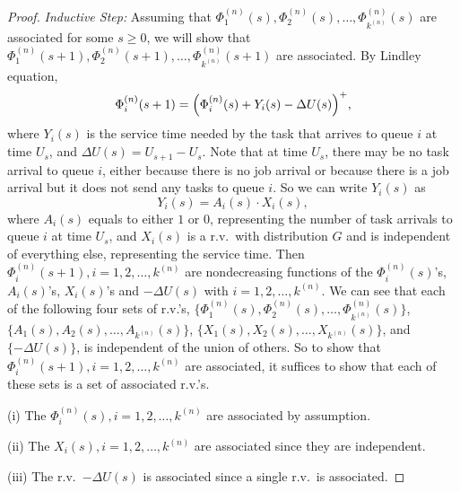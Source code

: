 \documentclass[sigconf]{acmart}
\newcommand{\supn}{^{(n)}}
\begin{document}
\begin{proof}
\begin{sloppypar}
\emph{Inductive Step:}
Assuming that $\Phi\supn_1(s),\Phi\supn_2(s),\dots,\Phi\supn_{k\supn}(s)$ are associated for some $s\ge 0$, we will show that $\Phi\supn_1(s+1),\allowbreak\Phi\supn_2(s+1),\dots,\allowbreak\Phi\supn_{k\supn}(s+1)$ are associated. By Lindley equation,
\begin{equation}\label{eq:lindley}
\Phi\supn_i(s+1)=\Bigl(\Phi\supn_i(s)+ Y_i(s) - \Delta U(s)\Bigr)^+,
\end{equation}
where $Y_i(s)$ is the service time needed by the task that arrives to queue $i$ at time $U_s$, and $\Delta U(s)=U_{s+1}-U_s$.  Note that at time $U_s$, there may be no task arrival to queue $i$, either because there is no job arrival or because there is a job arrival but it does not send any tasks to queue $i$. So we can write $Y_i(s)$ as
\begin{equation*}
Y_i(s)=A_i(s)\cdot X_i(s),
\end{equation*}
where $A_i(s)$ equals to either $1$ or $0$, representing the number of task arrivals to queue $i$ at time $U_{s}$, and $X_i(s)$ is a r.v.\ with distribution $G$ and is independent of everything else, representing the service time.  Then $\Phi\supn_i(s+1),i=1,2,\dots,k\supn$ are nondecreasing functions of the $\Phi\supn_i(s)$'s, $A_i(s)$'s, $X_i(s)$'s and $-\Delta U(s)$ with $i=1,2,\dots,k\supn$.  We can see that each of the following four sets of r.v.'s, $\bigl\{\Phi\supn_1(s),\allowbreak \Phi\supn_2(s),\dots,\allowbreak \Phi\supn_{k\supn}(s)\bigr\}$, $\{A_1(s),\allowbreak A_2(s),\dots,\allowbreak A_{k\supn}(s)\}$, $\{X_1(s),\allowbreak X_2(s),\dots,\allowbreak X_{k\supn}(s)\}$, and $\{-\Delta U(s)\}$, is independent of the union of others.  So to show that $\Phi\supn_i(s+1),i=1,2,\dots,k\supn$ are associated, it suffices to show that each of these sets is a set of associated r.v.'s.
\end{sloppypar}


(i) The $\Phi\supn_i(s),i=1,2,\dots,k\supn$ are associated by assumption.

(ii) The $X_i(s),i=1,2,\dots,k\supn$ are associated since they are independent.

(iii) The r.v.\ $-\Delta U(s)$ is associated since a single r.v.\ is associated.




\end{proof}
\end{document}
